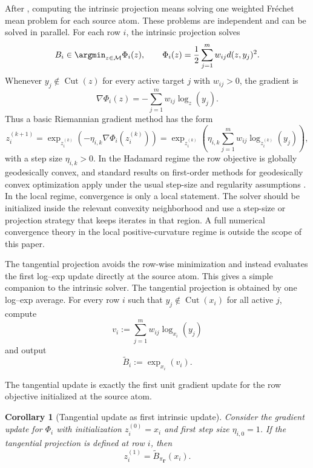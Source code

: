 \documentclass[10pt]{article} %
\newtheorem{corollary}[corollary]{Corollary}
\theoremstyle{definition}
\providecommand{\1}{\mathbf{1}}
\providecommand{\sM}{\mathcal{M}}
\providecommand{\mGamma}{\boldsymbol{\Gamma}}
\DeclareMathOperator{\Cut}{Cut}
\begin{document}
After , computing the intrinsic projection means solving one weighted Fr\'echet mean problem for each source atom. These problems are independent and can be solved in parallel. For each row $i$, the intrinsic projection solves
\[
B_i\in\argmin_{z\in\sM}\Phi_i(z),
\qquad
\Phi_i(z)=\frac12\sum_{j=1}^m w_{ij}d(z,y_j)^2.
\]
Whenever $y_j\notin\Cut(z)$ for every active target $j$ with $w_{ij}>0$, the gradient is
\[
\nabla\Phi_i(z)=-\sum_{j=1}^m w_{ij}\log_z(y_j).
\]
Thus a basic Riemannian gradient method has the form
\[
z_i^{(k+1)}
=
\exp_{z_i^{(k)}}\left(-\eta_{i,k} \nabla\Phi_i\left(z_i^{(k)}\right)\right)
=
\exp_{z_i^{(k)}}\left(\eta_{i,k}\sum_{j=1}^m w_{ij}\log_{z_i^{(k)}}(y_j)\right),
\]
with a step size $\eta_{i,k}>0$. In the Hadamard regime the row objective is globally geodesically convex, and standard results on first-order methods for geodesically convex optimization apply under the usual step-size and regularity assumptions \citep{zhang_2016_FirstorderMethodsGeodesically}. In the local regime, convergence is only a local statement. The solver should be initialized inside the relevant convexity neighborhood and use a step-size or projection strategy that keeps iterates in that region. A full numerical convergence theory in the local positive-curvature regime is outside the scope of this paper.



The tangential projection avoids the row-wise minimization and instead evaluates the first log--exp update directly at the source atom. This gives a simple companion to the intrinsic solver. The tangential projection is obtained by one log--exp average. For every row $i$ such that $y_j\notin\Cut(x_i)$ for all active $j$, compute
\[
v_i:=\sum_{j=1}^m w_{ij}\log_{x_i}(y_j)
\]
and output
\[
\widetilde B_i:=\exp_{x_i}(v_i).
\]

The tangential update is exactly the first unit gradient update for the row objective initialized at the source atom.

\begin{corollary}[Tangential update as first intrinsic update]
\label{cor:tangent_first_discrete}
Consider the gradient update for $\Phi_i$ with initialization $z_i^{(0)}=x_i$ and first step size $\eta_{i,0}=1$. If the tangential projection is defined at row $i$, then
\[
z_i^{(1)}=\widetilde B_{\pi_{\mGamma}}(x_i).
\]
\end{corollary}
\end{document}
